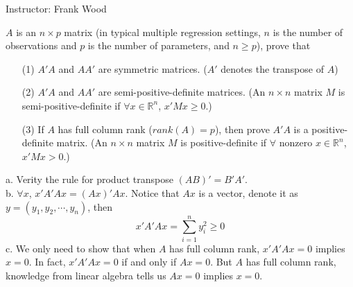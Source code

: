 \documentclass[12pt]{article}
\begin{document}
 \begin{center}
  Instructor: Frank Wood
 \end{center}
{}
\finishfirstpage



 {
$A$ is an $n\times p$ matrix (in typical multiple regression settings, $n$ is the number of observations and $p$ is the number of parameters, and $n\ge p$), prove that
\begin{enumerate}
\item[(1)] $A'A$ and $AA'$ are symmetric matrices. ($A'$ denotes the transpose of $A$)
\item[(2)] $A'A$ and $AA'$ are semi-positive-definite matrices. (An $n\times n$ matrix $M$ is semi-positive-definite if $\forall x\in \mathbb{R}^n$, $x'Mx\ge0$.)
\item[(3)] If $A$ has full column rank ($rank(A)=p$), then prove $A'A$ is a positive-definite matrix. (An $n\times n$ matrix $M$ is positive-definite if $\forall$ nonzero $ x\in \mathbb{R}^n$, $x'Mx>0$.)
\end{enumerate}
}
 { \vfill
  \answer
} {
a. Verity the rule for product transpose $(AB)' = B'A'$.\\
b. $\forall x$, $x'A'Ax = (Ax)'Ax$. Notice that $Ax$ is a vector, denote it as $y = (y_1, y_2, \cdots, y_n)$, then
$$x'A'Ax = \sum^n_{i=1}y_i^2 \geq 0$$
c. We only need to show that when $A$ has full column rank, $x'A'Ax = 0$ implies $x = 0$. In
fact, $x'A'Ax = 0$ if and only if $Ax = 0$. But $A$ has full column rank, knowledge from linear
algebra tells us $Ax = 0$ implies $x = 0$.
}
\end{document}

